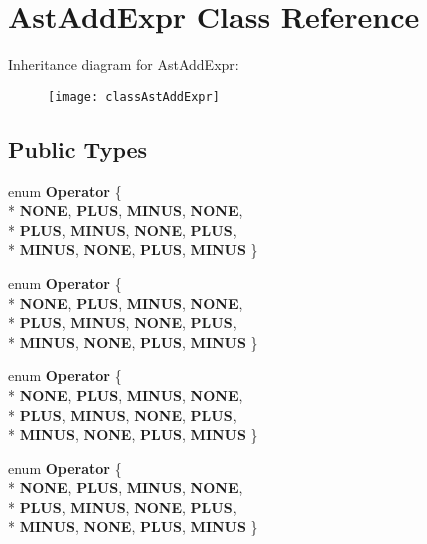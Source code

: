 \hypertarget{classAstAddExpr}{\section{Ast\-Add\-Expr Class Reference}
\label{classAstAddExpr}
}
Inheritance diagram for Ast\-Add\-Expr\-:\begin{figure}[H]
\begin{center}
\leavevmode
\texttt{[image: classAstAddExpr]}
\end{center}
\end{figure}
\subsection*{Public Types}
\begin{DoxyCompactItemize}
\item 
enum {\bfseries Operator} \{ \\*
{\bfseries N\-O\-N\-E}, 
{\bfseries P\-L\-U\-S}, 
{\bfseries M\-I\-N\-U\-S}, 
{\bfseries N\-O\-N\-E}, 
\\*
{\bfseries P\-L\-U\-S}, 
{\bfseries M\-I\-N\-U\-S}, 
{\bfseries N\-O\-N\-E}, 
{\bfseries P\-L\-U\-S}, 
\\*
{\bfseries M\-I\-N\-U\-S}, 
{\bfseries N\-O\-N\-E}, 
{\bfseries P\-L\-U\-S}, 
{\bfseries M\-I\-N\-U\-S}
 \}
\item 
enum {\bfseries Operator} \{ \\*
{\bfseries N\-O\-N\-E}, 
{\bfseries P\-L\-U\-S}, 
{\bfseries M\-I\-N\-U\-S}, 
{\bfseries N\-O\-N\-E}, 
\\*
{\bfseries P\-L\-U\-S}, 
{\bfseries M\-I\-N\-U\-S}, 
{\bfseries N\-O\-N\-E}, 
{\bfseries P\-L\-U\-S}, 
\\*
{\bfseries M\-I\-N\-U\-S}, 
{\bfseries N\-O\-N\-E}, 
{\bfseries P\-L\-U\-S}, 
{\bfseries M\-I\-N\-U\-S}
 \}
\item 
enum {\bfseries Operator} \{ \\*
{\bfseries N\-O\-N\-E}, 
{\bfseries P\-L\-U\-S}, 
{\bfseries M\-I\-N\-U\-S}, 
{\bfseries N\-O\-N\-E}, 
\\*
{\bfseries P\-L\-U\-S}, 
{\bfseries M\-I\-N\-U\-S}, 
{\bfseries N\-O\-N\-E}, 
{\bfseries P\-L\-U\-S}, 
\\*
{\bfseries M\-I\-N\-U\-S}, 
{\bfseries N\-O\-N\-E}, 
{\bfseries P\-L\-U\-S}, 
{\bfseries M\-I\-N\-U\-S}
 \}
\item 
enum {\bfseries Operator} \{ \\*
{\bfseries N\-O\-N\-E}, 
{\bfseries P\-L\-U\-S}, 
{\bfseries M\-I\-N\-U\-S}, 
{\bfseries N\-O\-N\-E}, 
\\*
{\bfseries P\-L\-U\-S}, 
{\bfseries M\-I\-N\-U\-S}, 
{\bfseries N\-O\-N\-E}, 
{\bfseries P\-L\-U\-S}, 
\\*
{\bfseries M\-I\-N\-U\-S}, 
{\bfseries N\-O\-N\-E}, 
{\bfseries P\-L\-U\-S}, 
{\bfseries M\-I\-N\-U\-S}
 \}
\end{DoxyCompactItemize}
